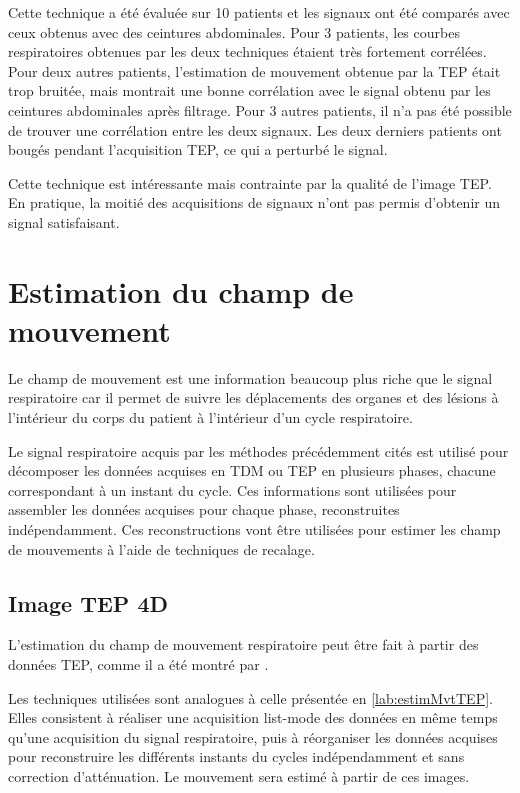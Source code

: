 Cette technique a été évaluée sur 10 patients et les signaux ont été comparés avec ceux obtenus avec des ceintures abdominales. Pour 3 patients, les courbes respiratoires obtenues par les deux techniques étaient très fortement corrélées. Pour deux autres patients, l'estimation de mouvement obtenue par la TEP était trop bruitée, mais montrait une bonne corrélation avec le signal obtenu par les ceintures abdominales après filtrage. Pour 3 autres patients, il n'a pas été possible de trouver une corrélation entre les deux signaux. Les deux derniers patients ont bougés pendant l'acquisition TEP, ce qui a perturbé le signal.

Cette technique est intéressante mais contrainte par la qualité de l'image TEP. En pratique, la moitié des acquisitions de signaux n'ont pas permis d'obtenir un signal satisfaisant.


\section{Estimation du champ de mouvement}
\label{lab:estimChamp}
Le champ de mouvement est une information beaucoup plus riche que le signal respiratoire car il permet de suivre les déplacements des organes et des lésions à l'intérieur du corps du patient à l'intérieur d'un cycle respiratoire.

Le signal respiratoire acquis par les méthodes précédemment cités est utilisé pour décomposer les données acquises en TDM ou TEP en plusieurs phases, chacune correspondant à un instant du cycle. Ces informations sont utilisées pour assembler les données acquises pour chaque phase, reconstruites indépendamment. Ces reconstructions vont être utilisées pour estimer les champ de mouvements à l'aide de techniques de recalage.


\subsection{Image TEP 4D}

L'estimation du champ de mouvement respiratoire peut être fait à partir des données TEP, comme il a été montré par \cite{dawood2008respiratory, dawood2006lung}. 

Les techniques utilisées sont analogues à celle présentée en \ref{lab:estimMvtTEP}. Elles consistent à réaliser une acquisition list-mode des données en même temps qu'une acquisition du signal respiratoire, puis à réorganiser les données acquises pour reconstruire les différents instants du cycles indépendamment et sans correction d'atténuation. Le mouvement sera estimé à partir de ces images.

